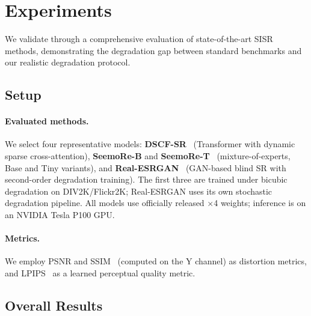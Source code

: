 \section{Experiments}
\label{sec:experiments}

We validate \dataset through a comprehensive evaluation of state-of-the-art SISR methods, demonstrating the degradation gap between standard benchmarks and our realistic degradation protocol.

\subsection{Setup}
\label{sec:exp_setup}

\paragraph{Evaluated methods.}
We select four representative models:
\textbf{DSCF-SR}~\cite{xiao2024dscf} (Transformer with dynamic sparse cross-attention),
\textbf{SeemoRe-B} and \textbf{SeemoRe-T}~\cite{zamfir2024seemore} (mixture-of-experts, Base and Tiny variants), and
\textbf{Real-ESRGAN}~\cite{wang2021real} (GAN-based blind SR with second-order degradation training).
The first three are trained under bicubic degradation on DIV2K/Flickr2K; Real-ESRGAN uses its own stochastic degradation pipeline.
All models use officially released $\times$4 weights; inference is on an NVIDIA Tesla P100 GPU.

\paragraph{Metrics.}
We employ PSNR and SSIM~\cite{wang2004image} (computed on the Y channel) as distortion metrics, and LPIPS~\cite{zhang2018unreasonable} as a learned perceptual quality metric.

\subsection{Overall Results}
\label{sec:exp_results}

